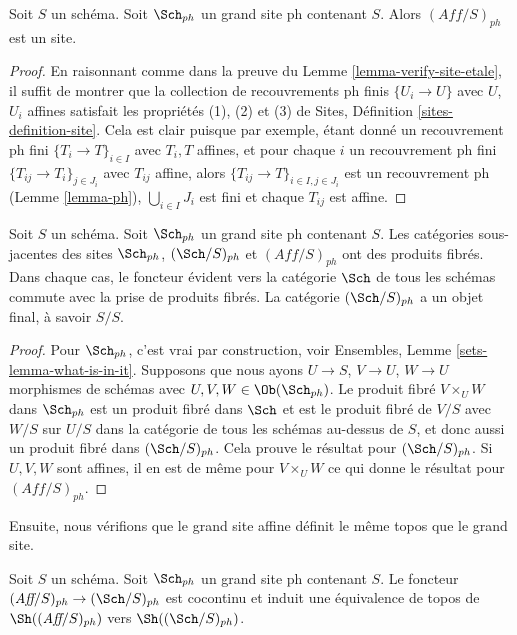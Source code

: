 \begin{lemma}
\label{lemma-verify-site-ph}
Soit $S$ un schéma. Soit $\Sch_{ph}$ un grand site ph contenant $S$. Alors $(\textit{Aff}/S)_{ph}$ est un site.
\end{lemma}

\begin{proof}
En raisonnant comme dans la preuve du Lemme \ref{lemma-verify-site-etale}, il suffit de montrer que la collection de recouvrements ph finis $\{U_i \to U\}$ avec $U$, $U_i$ affines satisfait les propriétés (1), (2) et (3) de Sites, Définition \ref{sites-definition-site}. Cela est clair puisque par exemple, étant donné un recouvrement ph fini $\{T_i \to T\}_{i\in I}$ avec $T_i, T$ affines, et pour chaque $i$ un recouvrement ph fini $\{T_{ij} \to T_i\}_{j\in J_i}$ avec $T_{ij}$ affine, alors $\{T_{ij} \to T\}_{i \in I, j\in J_i}$ est un recouvrement ph (Lemme \ref{lemma-ph}), $\bigcup_{i\in I} J_i$ est fini et chaque $T_{ij}$ est affine.
\end{proof}

\begin{lemma}
\label{lemma-fibre-products-ph}
Soit $S$ un schéma. Soit $\Sch_{ph}$ un grand site ph contenant $S$. Les catégories sous-jacentes des sites $\Sch_{ph}$, $(\Sch/S)_{ph}$ et $(\textit{Aff}/S)_{ph}$ ont des produits fibrés. Dans chaque cas, le foncteur évident vers la catégorie $\Sch$ de tous les schémas commute avec la prise de produits fibrés. La catégorie $(\Sch/S)_{ph}$ a un objet final, à savoir $S/S$.
\end{lemma}

\begin{proof}
Pour $\Sch_{ph}$, c'est vrai par construction, voir Ensembles, Lemme \ref{sets-lemma-what-is-in-it}. Supposons que nous ayons $U \to S$, $V \to U$, $W \to U$ morphismes de schémas avec $U, V, W \in \Ob(\Sch_{ph})$. Le produit fibré $V \times_U W$ dans $\Sch_{ph}$ est un produit fibré dans $\Sch$ et est le produit fibré de $V/S$ avec $W/S$ sur $U/S$ dans la catégorie de tous les schémas au-dessus de $S$, et donc aussi un produit fibré dans $(\Sch/S)_{ph}$. Cela prouve le résultat pour $(\Sch/S)_{ph}$. Si $U, V, W$ sont affines, il en est de même pour $V \times_U W$ ce qui donne le résultat pour $(\textit{Aff}/S)_{ph}$.
\end{proof}

\noindent
Ensuite, nous vérifions que le grand site affine définit le même topos que le grand site.

\begin{lemma}
\label{lemma-affine-big-site-ph}
Soit $S$ un schéma. Soit $\Sch_{ph}$ un grand site ph contenant $S$. Le foncteur $(\textit{Aff}/S)_{ph} \to (\Sch/S)_{ph}$ est cocontinu et induit une équivalence de topos de $\Sh((\textit{Aff}/S)_{ph})$ vers $\Sh((\Sch/S)_{ph})$.
\end{lemma}


